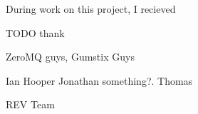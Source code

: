 

\begin{acknowledgements}      %

During work on this project, I recieved 

TODO thank

ZeroMQ guys,
Gumstix Guys

Ian Hooper
Jonathan something?.
Thomas

REV Team

\end{acknowledgements}



